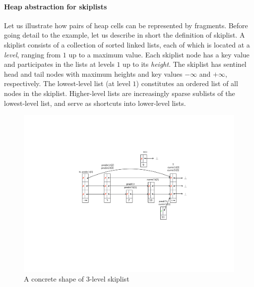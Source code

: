\paragraph{Heap abstraction for skiplists}
Let us illustrate how pairs of heap cells can be represented by fragments. Before going detail to the example, let us describe in short the definition of skiplist. A skiplist consists of a collection of sorted linked lists, each of which is located at a {\em level}, ranging from $1$ up to a maximum value. Each skiplist node has a key value and participates in the lists at levels $1$ up to its {\em height}.
The skiplist has sentinel head and tail nodes with maximum heights and key values $-\infty$ and $+\infty$, respectively.
The lowest-level list (at level $1$) constitutes an ordered list of all nodes
in the skiplist. Higher-level lists are increasingly sparse sublists of the
lowest-level list, and serve as shortcuts into lower-level lists.
\begin{figure}
\center  
 \includegraphics[width=1.2\textwidth, trim={7cm 8cm 0.5cm 6cm}, clip]{skipshape.pdf}  
 \caption{A concrete shape of 3-level skiplist}
\label{sl-shape}
\end{figure}

